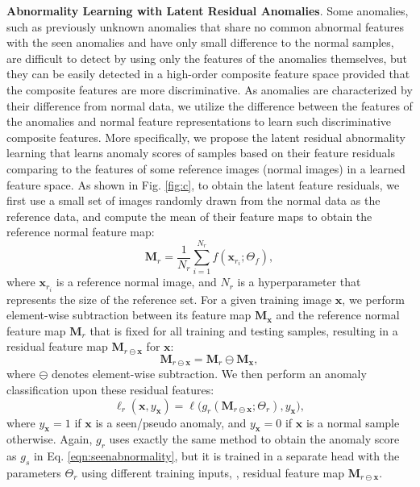 \documentclass[10pt,twocolumn,letterpaper]{article}
\newcommand{\xvec}{{\mathbf{x}}}
\newcommand{\yxvec}{{y_{\mathbf{x}}}}
\begin{document}
\textbf{Abnormality Learning with Latent Residual Anomalies}.
Some anomalies, such as previously unknown anomalies that share no common abnormal features with the seen anomalies and have only small difference to the normal samples, are difficult to detect by using only the features of the anomalies themselves, but they can be easily detected in a high-order composite feature space provided that the composite features are more discriminative. As anomalies are characterized by their difference from normal data, we utilize the difference between the features of the anomalies and normal feature representations to learn such discriminative composite features.
More specifically, we propose the latent residual abnormality learning that learns anomaly scores of samples based on their feature residuals comparing to the features of some reference images (normal images) in a learned feature space. As shown in Fig. \ref{fig:c}, to obtain the latent feature residuals, we first use a small set of images randomly drawn from the normal data as the reference data, and compute the mean of their feature maps to obtain the reference normal feature map:
\begin{equation}
    \mathbf{M}_r = \frac{1}{\mathit{N}_{r}}\sum_{i=1}^{\mathit{N}_{r}} f(\xvec_{{r}_i};\Theta_f),
\end{equation}
where $\xvec_{{r}_i}$ is a reference normal image, and $\mathit{N}_{r}$ is a hyperparameter that represents the size of the reference set. 
For a given training image $\xvec$, we perform element-wise subtraction between its feature map $\mathbf{M}_{\xvec}$ and the reference normal feature map $\mathbf{M}_r$ that is fixed for all training and testing samples, resulting in a residual feature map $\mathbf{M}_{r \ominus \xvec}$ for $\xvec$:
\begin{equation}
    \mathbf{M}_{r \ominus \xvec} = \mathbf{M}_r \ominus  \mathbf{M}_{\xvec},
\end{equation}
where $\ominus$ denotes element-wise subtraction. We then perform an anomaly classification upon these residual features:
\begin{equation}
    \ell_{r}(\mathbf{x}, \yxvec) = \ell\big(g_r(\mathbf{M}_{r \ominus \xvec};\Theta_r), \yxvec\big),
\end{equation}
where $\yxvec = 1$ if $\xvec$ is a seen/pseudo anomaly, and $\yxvec = 0$ if $\xvec$ is a normal sample otherwise. Again, $g_r$ uses exactly the same method to obtain the anomaly score as $g_s$ in Eq. \ref{eqn:seenabnormality}, but it is trained in a separate head with the parameters $\Theta_r$ using different training inputs, \ie, residual feature map $\mathbf{M}_{r \ominus \xvec}$.
\end{document}
